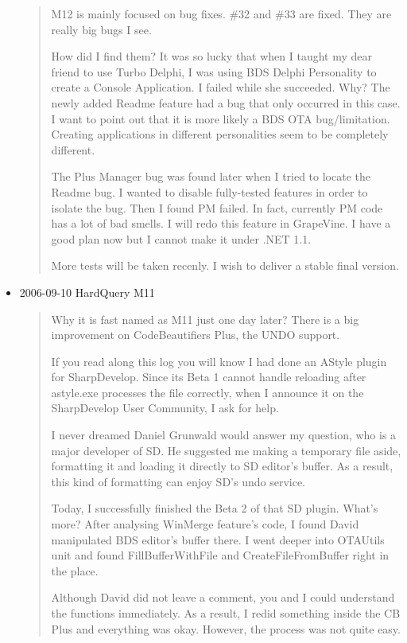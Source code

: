 \begin{itemize}
\begin{quotation}
    M12 is mainly focused on bug fixes. \#32 and \#33 are fixed. They are
    really big bugs I see.

    How did I find them? It was so lucky that when I taught my dear friend
    to use Turbo Delphi, I was using BDS Delphi Personality to create a
    Console Application. I failed while she succeeded. Why? The newly added
    Readme feature had a bug that only occurred in this case. I want to
    point out that it is more likely a BDS OTA bug/limitation. Creating
    applications in different personalities seem to be completely different.

    The Plus Manager bug was found later when I tried to locate the Readme
    bug. I wanted to disable fully-tested features in order to isolate the
    bug. Then I found PM failed. In fact, currently PM code has a lot of
    bad smells. I will redo this feature in GrapeVine. I have a good plan
    now but I cannot make it under .NET 1.1.

    More tests will be taken recenly. I wish to deliver a stable final
    version.
  \end{quotation}

  \item 2006-09-10 HardQuery M11
  \begin{quotation}
    Why it is fast named as M11 just one day later? There is a big
    improvement on CodeBeautifiers Plus, the UNDO support.

    If you read along this log you will know I had done an AStyle plugin
    for SharpDevelop. Since its Beta 1 cannot handle reloading after
    astyle.exe processes the file correctly, when I announce it on the
    SharpDevelop User Community, I ask for help.

    I never dreamed Daniel Grunwald would answer my question, who is a
    major developer of SD. He suggested me making a temporary file aside,
    formatting it and loading it directly to SD editor's buffer. As a
    result, this kind of formatting can enjoy SD's undo service.

    Today, I successfully finished the Beta 2 of that SD plugin. What's
    more? After analysing WinMerge feature's code, I found David
    manipulated BDS editor's buffer there. I went deeper into OTAUtils unit
    and found FillBufferWithFile and CreateFileFromBuffer right in the
    place.

    Although David did not leave a comment, you and I could understand the
    functions immediately. As a result, I redid something inside the CB
    Plus and everything was okay. However, the process was not quite easy.


\end{quotation}
\end{itemize}
